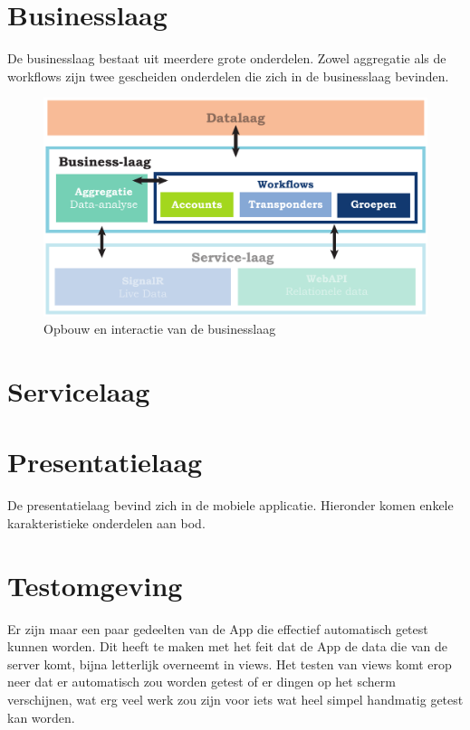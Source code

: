   

\section{Businesslaag}
  De businesslaag bestaat uit meerdere grote onderdelen. Zowel aggregatie als de workflows zijn twee gescheiden onderdelen die zich in de businesslaag bevinden.
 
\begin{figure}[ht]
  \includegraphics[width=\textwidth]{style/images/Businesslaag}    
  \caption{Opbouw en interactie van de businesslaag}  
  \label{fig:lagen-businesslaag}
\end{figure}
  
  
  
  
  
\section{Servicelaag}
  
  

\section{Presentatielaag}
  De presentatielaag bevind zich in de mobiele applicatie. Hieronder komen enkele karakteristieke onderdelen aan bod.
  

\section{Testomgeving}
Er zijn maar een paar gedeelten van de App die effectief automatisch getest kunnen worden. Dit heeft te maken met het feit dat de App de data die van de server komt, bijna letterlijk overneemt in views. Het testen van views komt erop neer dat er automatisch zou worden getest of er dingen op het scherm verschijnen, wat erg veel werk zou zijn voor iets wat heel simpel handmatig getest kan worden.

